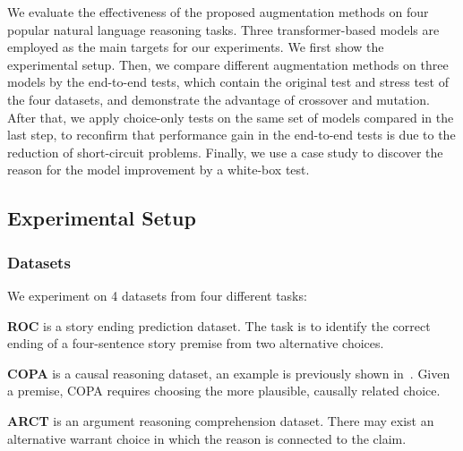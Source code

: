 
We evaluate the effectiveness of the proposed augmentation methods on four popular 
natural language reasoning tasks.
Three transformer-based models are employed as the
main targets for our experiments. 
We first show the experimental setup. 
Then, we compare different augmentation methods on three models by the 
end-to-end tests, which contain
the original test and stress test of the four datasets, and demonstrate
the advantage of crossover and mutation. 
After that, we apply choice-only tests on the same set of models compared in the
last step, to reconfirm that performance gain in the end-to-end tests is
due to the reduction of short-circuit problems.
Finally, we use a case study to discover the reason for the model improvement 
by a white-box test.

\subsection{Experimental Setup} 
\label{sec:setup}
\subsubsection{Datasets}
We experiment on 4 datasets from four different tasks:

\textbf{ROC} is a story ending prediction dataset. 
The task is to identify the correct ending of a four-sentence 
story premise from two alternative choices. 

\textbf{COPA} is a causal reasoning dataset, an example is previously shown
in~. Given a premise, 
COPA requires choosing the more plausible, causally related choice. 

\textbf{ARCT} is an argument reasoning comprehension dataset. 
There may exist an alternative warrant choice 
in which the reason is connected to the claim.

